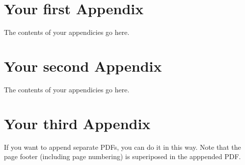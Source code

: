 \begin{appendices}
\newpage
\chapter{Your first Appendix}
The contents of your appendicies go here.
\chapter{Your second Appendix}
The contents of your appendicies go here.

\chapter{Your third Appendix}
If you want to append separate PDFs, you can do it in this way. Note that the page footer (including page numbering) is superiposed in the apppended PDF.

\end{appendices}